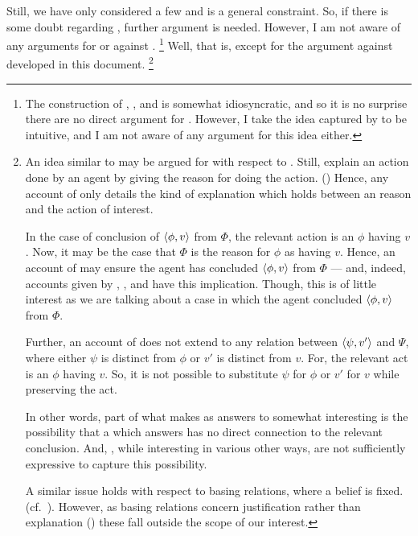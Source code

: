 \begin{note}
  Still, we have only considered a few  and \issueInclusion{} is a general constraint.
  So, if there is some doubt regarding \issueInclusion{}, further argument is needed.
  However, I am not aware of any arguments for or against \issueInclusion{}.%
  \footnote{
    The construction of \qWhy{}, \qHow{}, and \issueInclusion{} is somewhat idiosyncratic, and so it is no surprise there are no direct argument for \issueInclusion{}.
    However, I take the idea captured by \issueInclusion{} to be intuitive, and I am not aware of any argument for this idea either.
  }
  Well, that is, except for the argument against \issueInclusion{} developed in this document.%
  \footnote{
    An idea similar to \issueInclusion{} may be argued for with respect to \emph{}.
    Still,  explain an action done by an agent by giving the \agents{} reason for doing the action.
    (\cite[685]{Davidson:1963aa})
    Hence, any account of  only details the kind of explanation which holds between an \agents{} reason and the action of interest.

    In the case of conclusion of \(\langle\phi, v\rangle\) from \(\Phi\), the relevant action is an \evalion{} \(\phi\) having \val{} \(v\).
    Now, it may be the case that \(\Phi\) is the \agents{} reason for \evaling{} \(\phi\) as having \val{} \(v\).
    Hence, an account of  may ensure the agent has concluded \(\langle\phi, v\rangle\) from \(\Phi\) --- and, indeed, accounts given by \textcite{Davidson:1963aa}, \textcite{Hieronymi:2011aa}, and \textcite{Harman:1973ww} have this implication.
    Though, this is of little interest as we are talking about a case in which the agent concluded \(\langle\phi, v\rangle\) from \(\Phi\).

    Further, an account of  does not extend to any relation between \(\langle\psi, v'\rangle\) and \(\Psi\), where either \(\psi\) is distinct from \(\phi\) or \(v'\) is distinct from \(v\).
    For, the relevant act is an \evalion{} \(\phi\) having \val{} \(v\).
    So, it is not possible to substitute \(\psi\) for \(\phi\) or \(v'\) for \(v\) while preserving the act.

    In other words, part of what makes  as answers to \qWhy{} somewhat interesting is the possibility that a  which answers \qWhy{} has no direct connection to the relevant conclusion.
    And, , while interesting in various other ways, are not sufficiently expressive to capture this possibility.

    A similar issue holds with respect to basing relations, where a belief is fixed.
    (cf.\ \cite{Korcz:2021ue}).
    However, as basing relations concern justification rather than explanation (\cite[cf.][35]{Pollock:1999tm}) these fall outside the scope of our interest.
  }
\end{note}



